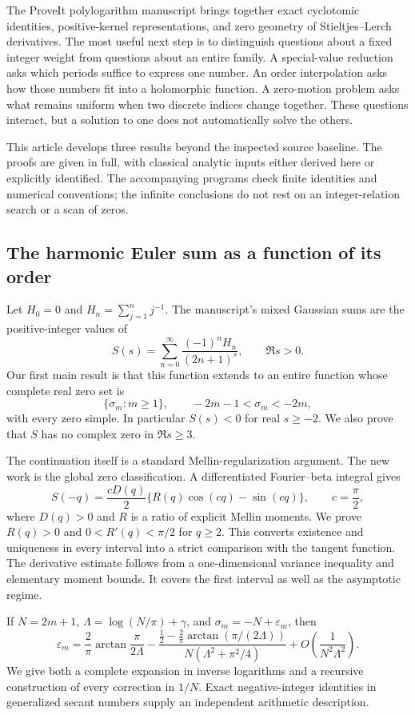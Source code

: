 \documentclass[11pt,a4paper]{article}
\theoremstyle{definition}
\theoremstyle{remark}
\numberwithin{equation}{section}
\begin{document}
The ProveIt polylogarithm manuscript brings together exact cyclotomic
identities, positive-kernel representations, and zero geometry of
Stieltjes--Lerch derivatives. The most useful next step is to distinguish
questions about a fixed integer weight from questions about an entire
family. A special-value reduction asks which periods suffice to express
one number. An order interpolation asks how those numbers fit into a
holomorphic function. A zero-motion problem asks what remains uniform
when two discrete indices change together. These questions interact, but
a solution to one does not automatically solve the others.

This article develops three results beyond the inspected source baseline.
The proofs are given in full, with classical analytic inputs either
derived here or explicitly identified. The accompanying programs check
finite identities and numerical conventions; the infinite conclusions
do not rest on an integer-relation search or a scan of zeros.

\subsection{The harmonic Euler sum as a function of its order}

Let $H_0=0$ and $H_n=\sum_{j=1}^n j^{-1}$. The manuscript's mixed
Gaussian sums are the positive-integer values of
\[
 S(s)=\sum_{n=0}^{\infty}\frac{(-1)^nH_n}{(2n+1)^s},
 \qquad \Re s>0.
\]
Our first main result is that this function extends to an entire function
whose complete real zero set is
\[
 \{\sigma_m:m\ge1\},\qquad -2m-1<\sigma_m<-2m,
\]
with every zero simple. In particular $S(s)<0$ for real $s\ge-2$.
We also prove that $S$ has no complex zero in $\Re s\ge3$.

The continuation itself is a standard Mellin-regularization argument.
The new work is the global zero classification. A differentiated
Fourier--beta integral gives
\[
 S(-q)=\frac{cD(q)}2\{R(q)\cos(cq)-\sin(cq)\},\qquad c=\frac\pi2,
\]
where $D(q)>0$ and $R$ is a ratio of explicit Mellin moments.
We prove $R(q)>0$ and $0<R'(q)<\pi/2$ for $q\ge2$. This converts
existence and uniqueness in every interval into a strict comparison
with the tangent function. The derivative estimate follows from a
one-dimensional variance inequality and elementary moment bounds.
It covers the first interval as well as the asymptotic regime.

If $N=2m+1$, $\Lambda=\log(N/\pi)+\gamma$, and
$\sigma_m=-N+\varepsilon_m$, then
\[
 \varepsilon_m=
 \frac2\pi\arctan\frac{\pi}{2\Lambda}
 -\frac{\frac12-\frac2\pi\arctan(\pi/(2\Lambda))}
        {N(\Lambda^2+\pi^2/4)}
 +O\!\left(\frac1{N^2\Lambda^2}\right).
\]
We give both a complete expansion in inverse logarithms and a recursive
construction of every correction in $1/N$. Exact negative-integer
identities in generalized secant numbers supply an independent arithmetic
description.
\end{document}

